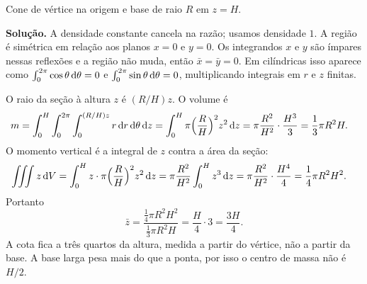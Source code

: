 \documentclass[11pt,a4paper]{article}
\begin{document}
\begin{exercicio}
Cone de vértice na origem e base de raio $R$ em $z=H$.

\textbf{Solução.}
A densidade constante cancela na razão; usamos densidade $1$. A região é simétrica em relação aos planos $x=0$ e $y=0$. Os integrandos $x$ e $y$ são ímpares nessas reflexões e a região não muda, então $\bar x=\bar y=0$. Em cilíndricas isso aparece como $\int_0^{2\pi}\cos\theta\,\mathrm{d}\theta=0$ e $\int_0^{2\pi}\sin\theta\,\mathrm{d}\theta=0$, multiplicando integrais em $r$ e $z$ finitas.

O raio da seção à altura $z$ é $(R/H)z$. O volume é
\begin{align*}
m
&=\int_0^H\int_0^{2\pi}\int_0^{(R/H)z} r\,\mathrm{d} r\,\mathrm{d}\theta\,\mathrm{d} z
=\int_0^H \pi\Bigl(\frac{R}{H}\Bigr)^2 z^2\,\mathrm{d} z
=\pi\frac{R^2}{H^2}\cdot\frac{H^3}{3}
=\frac13\pi R^2 H.
\end{align*}
O momento vertical é a integral de $z$ contra a área da seção:
\begin{align*}
\iiint z\,\mathrm{d} V
&=\int_0^H z\cdot\pi\Bigl(\frac{R}{H}\Bigr)^2 z^2\,\mathrm{d} z
=\pi\frac{R^2}{H^2}\int_0^H z^3\,\mathrm{d} z
=\pi\frac{R^2}{H^2}\cdot\frac{H^4}{4}
=\frac14\pi R^2 H^2.
\end{align*}
Portanto
\[
\bar z=\frac{\frac14\pi R^2 H^2}{\frac13\pi R^2 H}=\frac{H}{4}\cdot 3=\frac{3H}{4}.
\]
A cota fica a três quartos da altura, medida a partir do vértice, não a partir da base. A base larga pesa mais do que a ponta, por isso o centro de massa não é $H/2$.
\end{exercicio}
\end{document}
